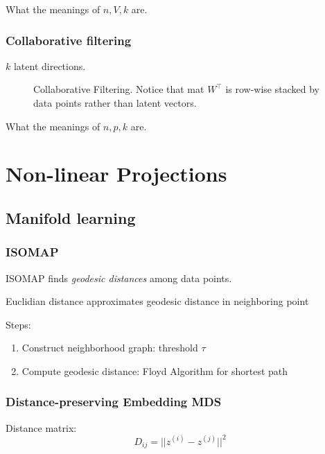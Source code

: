 \documentclass[a4paper]{report}
\begin{document}
What the meanings of $n, V, k$ are.
\subsection{Collaborative filtering}
$k$ latent directions. 

\begin{figure}[!htp]
\centering
{}
\caption{Collaborative Filtering. Notice that mat $W^\top$ is row-wise stacked by data points rather than latent vectors. }
\label{fig:collaborativeFiltering}
\end{figure}

What the meanings of $n, p, k$ are. 


\chapter{Non-linear Projections}
\section{Manifold learning}
\subsection{ISOMAP}
ISOMAP finds \textit{geodesic distances} among data points.

Euclidian distance approximates geodesic distance in neighboring point 

Steps:
\begin{enumerate}
\item Construct neighborhood graph: threshold $\tau$
\item Compute geodesic distance: Floyd Algorithm for shortest path
\end{enumerate}

\subsection{Distance-preserving Embedding MDS} 
Distance matrix:
$$
D_{ij} = ||z^{(i)}-z^{(j)}||^2
$$
\end{document}
